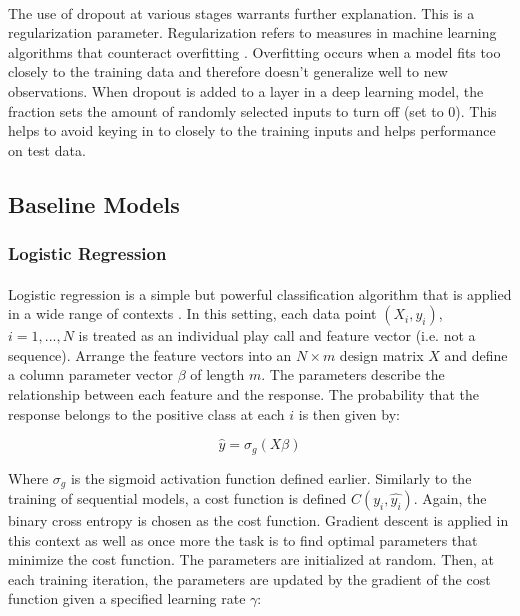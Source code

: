 \documentclass[11pt]{article}
\begin{document}
                    \begin{multicols*}{2}

                    \paragraph{}
                        The use of dropout at various stages warrants further explanation. 
                        This is a regularization parameter. 
                        Regularization refers to measures in machine learning algorithms that counteract overfitting \cite{Hastie01}.
                        Overfitting occurs when a model fits too closely to the training data and therefore doesn't generalize well to new observations.
                        When dropout is added to a layer in a deep learning model, the fraction sets the amount of randomly selected inputs to turn off (set to 0). 
                        This helps to avoid keying in to closely to the training inputs and helps performance on test data. 

        \subsection{Baseline Models}

            \subsubsection*{Logistic Regression}
                \paragraph{}
                    Logistic regression is a simple but powerful classification algorithm that is applied in a wide range of contexts \cite{Hastie01}.
                    In this setting, each data point $(X_i,y_i)$, $i = 1,...,N$ is treated as an individual play call and feature vector (i.e. not a sequence).
                    Arrange the feature vectors into an $N \times m$ design matrix $X$ and define a column parameter vector $\beta$ of length $m$.
                    The parameters describe the relationship between each feature and the response.
                    The probability that the response belongs to the positive class at each $i$ is then given by:
                    
                    $$\hat{y} = \sigma_g(X\beta)$$

                    Where $\sigma_g$ is the sigmoid activation function defined earlier. 
                    Similarly to the training of sequential models, a cost function is defined $C(y_i, \hat{y_i})$.
                    Again, the binary cross entropy is chosen as the cost function. 
                    Gradient descent is applied in this context as well as once more the task is to find optimal parameters that minimize the cost function.
                    The parameters are initialized at random.
                    Then, at each training iteration, the parameters are updated by the gradient of the cost function given a specified learning rate $\gamma$:


\end{multicols*}
\end{document}
